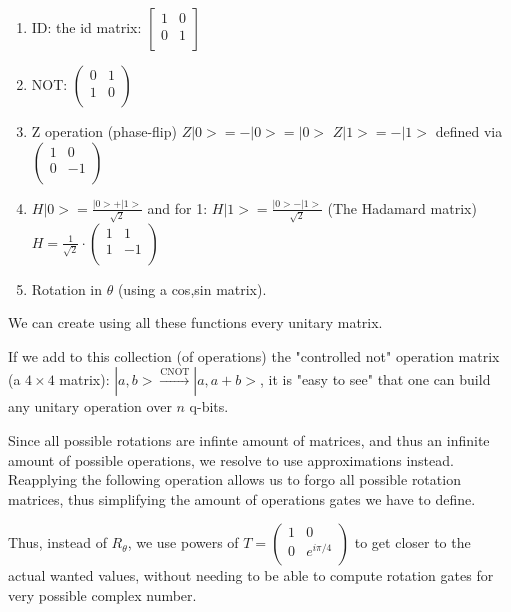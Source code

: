 \begin{enumerate}
    \item ID: the id matrix: $\begin{bmatrix}
        1 & 0  \\
        0 & 1 \\
    \end{bmatrix}$
    \item NOT: $\begin{pmatrix}
        0 & 1 \\
        1 & 0 \\
    \end{pmatrix}$
    \item Z operation (phase-flip) $Z|0> = -|0>=|0>$  $Z|1> = -|1>$ defined via $\begin{pmatrix}
        1 & 0  \\
        0 & -1 \\
    \end{pmatrix}$
    \item $H|0> = \frac{|0>+|1>}{\sqrt{2}}$ and for 1: $H|1> = \frac{|0> - |1>}{\sqrt{2}}$ (The Hadamard matrix) $H=\frac{1}{\sqrt{2}} \cdot\begin{pmatrix}
        1 &1 \\
        1 &-1 \\
    \end{pmatrix}$ 
    \item Rotation in $\theta$ (using a cos,sin matrix).
\end{enumerate}

We can create using all these functions every unitary matrix.

If we add to this collection (of operations) the "controlled not" operation matrix (a $4\times4$ matrix):
$|a,b> \overset{\text{CNOT}}{\to} |a,a+b>$, it is "easy to see" that one can build any unitary operation over $n$ q-bits.


Since all possible rotations are infinte amount of matrices, and thus an infinite amount of possible operations, we resolve to use approximations instead.
Reapplying the following operation allows us to forgo all possible rotation matrices, thus simplifying the amount of operations gates we have to define.

Thus, instead of $R_\theta$, we use powers of $T=\begin{pmatrix}
    1 &0 \\
    0 &e^{i\pi/4} \\
\end{pmatrix}$
to get closer to the actual wanted values, without needing to be able to compute rotation gates for very possible complex number.

